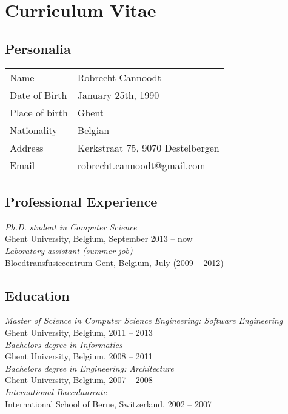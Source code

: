 \appendix


\newpage{\thispagestyle{empty}\cleardoublepage}
\chapter{Curriculum Vitae}
\section{Personalia}
\begin{tabular}{ll}
	Name & Robrecht Cannoodt \\
	Date of Birth & January 25th, 1990 \\
	Place of birth & Ghent \\
	Nationality & Belgian \\
	Address & Kerkstraat 75, 9070 Destelbergen \\
	Email & \href{mailto:robrecht.cannoodt@gmail.com}{robrecht.cannoodt@gmail.com}
\end{tabular}


\section{Professional Experience}
\textit{Ph.D. student in Computer Science} \\
\hspace*{2 ex} Ghent University, Belgium, September 2013 -- now \\
\textit{Laboratory assistant (summer job)} \\
\hspace*{2 ex} Bloedtransfusiecentrum Gent, Belgium, July (2009 -- 2012)


\section{Education} 
\textit{Master of Science in Computer Science Engineering: Software Engineering} \\
\hspace*{2 ex} Ghent University, Belgium, 2011 -- 2013 \vspace*{1mm}\\ 
\textit{Bachelors degree in Informatics}\\
\hspace*{2 ex} Ghent University, Belgium, 2008 -- 2011 \vspace*{1mm} \\
\textit{Bachelors degree in Engineering: Architecture} \\
\hspace*{2 ex} Ghent University, Belgium, 2007 -- 2008  \vspace*{1mm}\\
\textit{International Baccalaureate} \\
\hspace*{2 ex} International School of Berne, Switzerland, 2002 -- 2007


